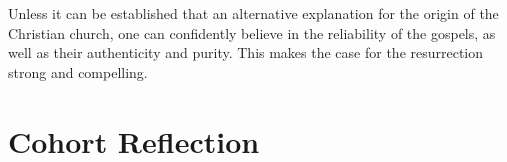 \documentclass[12pt]{turabian-researchpaper}
\begin{document}
Unless it can be established that an alternative explanation for the origin of the Christian church, one can confidently believe in the reliability of the gospels, as well as their authenticity and purity. This makes the case for the resurrection strong and compelling.



\section{Cohort Reflection}



\newpage
\printbibliography
\end{document}
